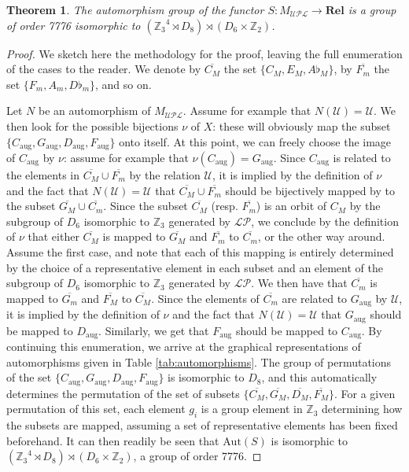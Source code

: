 \documentclass[10pt]{amsart}
\newtheorem{theorem}{Theorem}
\begin{document}
\begin{theorem}
The automorphism group of the functor $S \colon M_{\mathcal{UPL}} \to \mathbf{Rel}$ is a group of order 7776 isomorphic to $({\mathbb{Z}_3}^4 \rtimes D_8) \rtimes (D_6 \times \mathbb{Z}_2)$.
\end{theorem}
\begin{proof}
We sketch here the methodology for the proof, leaving the full enumeration of the cases to the reader. We denote by $\overline{C_M}$ the set $\{C_M, E_M, A\flat_M\}$, by $\overline{F_m}$ the set $\{F_m, A_m, D\flat_m\}$, and so on.

Let $N$ be an automorphism of $M_{\mathcal{U}\mathcal{P}\mathcal{L}}$. Assume for example that $N(\mathcal{U})=\mathcal{U}$. We then look for the possible bijections $\nu$ of $X$: these will obviously map the subset $\{C_{\text{aug}}, G_{\text{aug}}, D_{\text{aug}}, F_{\text{aug}}\}$ onto itself.
At this point, we can freely choose the image of $C_{\text{aug}}$ by $\nu$: assume for example that $\nu(C_{\text{aug}})=G_{\text{aug}}$.
Since $C_{\text{aug}}$ is related to the elements in $\overline{C_M} \cup \overline{F_m}$ by the relation $\mathcal{U}$, it is implied by the definition of $\nu$ and the fact that $N(\mathcal{U})=\mathcal{U}$ that $\overline{C_M} \cup \overline{F_m}$ should be bijectively mapped by to the subset $\overline{G_M} \cup \overline{C_m}$. Since the subset $\overline{C_M}$ (resp. $\overline{F_m}$) is an orbit of $C_M$ by the subgroup of $D_6$ isomorphic to $\mathbb{Z}_3$ generated by $\mathcal{L}\mathcal{P}$, we conclude by the definition of $\nu$ that either $\overline{C_M}$ is mapped to $\overline{G_M}$ and $\overline{F_m}$ to $\overline{C_m}$, or the other way around.
Assume the first case, and note that each of this mapping is entirely determined by the choice of a representative element in each subset and an element of the subgroup of $D_6$ isomorphic to $\mathbb{Z}_3$ generated by $\mathcal{L}\mathcal{P}$. We then have that $\overline{C_m}$ is mapped to $\overline{G_m}$ and $\overline{F_M}$ to $\overline{C_M}$. Since the elements of $\overline{C_m}$ are related to $G_{\text{aug}}$ by $\mathcal{U}$, it is implied by the definition of $\nu$ and the fact that $N(\mathcal{U})=\mathcal{U}$ that $G_{\text{aug}}$ should be mapped to $D_{\text{aug}}$. Similarly, we get that $F_{\text{aug}}$ should be mapped to $C_{\text{aug}}$. By continuing this enumeration, we arrive at the graphical representations of automorphisms given in Table \ref{tab:automorphisms}. The group of permutations of the set $\{C_{\text{aug}}, G_{\text{aug}}, D_{\text{aug}}, F_{\text{aug}}\}$ is isomorphic to $D_8$, and this automatically determines the permutation of the set of subsets $\{ \overline{C_M}, \overline{G_M}, \overline{D_M}, \overline{F_M} \}$. For a given permutation of this set, each element $g_i$ is a group element in $\mathbb{Z}_3$ determining how the subsets are mapped, assuming a set of representative elements has been fixed beforehand. It can then readily be seen that $\text{Aut}(S)$ is isomorphic to $({\mathbb{Z}_3}^4 \rtimes D_8) \rtimes (D_6 \times \mathbb{Z}_2)$, a group of order 7776.
\end{proof}
\end{document}
